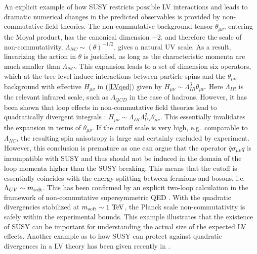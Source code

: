 \documentclass[12pt]{revtex4}
\begin{document}
An explicit example of how SUSY restricts possible LV interactions and
leads to dramatic numerical changes in the predicted observables is
provided by non-commutative field theories. The non-commutative
background tensor $\theta_{\mu\nu}$, entering the Moyal product, has
the canonical dimension $-2$, and therefore the scale of non-commutativity,
$\Lambda_{NC} \sim(\theta)^{-1/2}$, gives a natural UV scale. 
As a result, linearizing the action in $\theta$ is justified, as long as the
characteristic momenta are much smaller than $\Lambda_{NC}$. 
This expansion leads to a set of dimension six operators, which at the
tree level induce interactions between particle spins and the 
$\theta_{\mu\nu}$ background \cite{MPR1} with effective $H_{\mu\nu}$ in (\ref{LVqed})
given by 
$H_{\mu\nu} \sim\Lambda_{IR}^3\theta_{\mu\nu}$. 
Here $ \Lambda_{IR}$ is the relevant infrared scale, such as 
$\Lambda_{QCD}$ in the case of hadrons. However, it has been shown
that loop effects in non-commutative field theories lead to
quadratically divergent integrals \cite{UCSC}: 
$H_{\mu\nu} \sim \Lambda_{IR}\Lambda_{UV}^2\theta_{\mu\nu}$. 
This essentially invalidates the expansion in terms of $\theta_{\mu\nu}$. 
If the cutoff scale is very high, e.g.\ comparable to $\Lambda_{NC}$, 
the resulting spin anisotropy is large and certainly excluded by
experiment. However, this conclusion is premature as  
one can argue that the operator $\bar q \sigma_{\mu\nu} q$ 
is incompatible with SUSY \cite{MPR2} and thus should not be induced 
in the domain of the loop momenta higher than the SUSY breaking. 
This means that the cutoff is essentially coincides with the 
energy splitting between fermions and bosons, i.e.\ 
$\Lambda_{UV} \sim m_{\rm soft}$. 
This has been confirmed by an explicit two-loop calculation in the framework of 
non-commutative supersymmetric QED \cite{WMC2}. With the quadratic divergencies
stabilized at $m_{\rm soft}\sim 1~{\rm TeV}$,
the Planck scale non-commutativity is safely within the experimental 
bounds. This example illustrates that the existence of SUSY can be
important for understanding the actual size of the expected LV effects. 
Another example as to how SUSY can protect against quadratic
divergences in a LV theory has been given recently in \cite{Jain:2005as}. 
\end{document}
